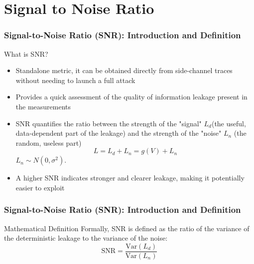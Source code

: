 \section{Signal to Noise Ratio}


\begin{frame}
    \frametitle{Signal-to-Noise Ratio (SNR): Introduction and Definition}
    \begin{block}{What is SNR?}
        \begin{itemize}
            \item Standalone metric, it can be obtained directly from side-channel traces without needing to launch a full attack
            \item Provides a quick assessment of the quality of information leakage present in the measurements
        \end{itemize}
    \end{block}

    \begin{block}{}
        \begin{itemize}
            \item SNR quantifies the ratio between the strength of the "signal" $L_d$(the useful, data-dependent part of the leakage) and the strength of the "noise" $L_n$ (the random, useless part) \newline \newline
                    $$L=L_d+L_n=g(V)+L_n$$  $L_n \sim N (0, \sigma^2 )$.

            \item A higher SNR indicates stronger and clearer leakage, making it potentially easier to exploit
        \end{itemize}
    \end{block}
\end{frame}
\begin{frame}
    \frametitle{Signal-to-Noise Ratio (SNR): Introduction and Definition}
    \begin{block}{Mathematical Definition}
            Formally, SNR is defined as the ratio of the variance of the deterministic leakage to the variance of the noise:
            $$ \text{SNR} = \frac{\text{Var}(L_d)}{\text{Var}(L_n)} $$
    \end{block}
\end{frame}


